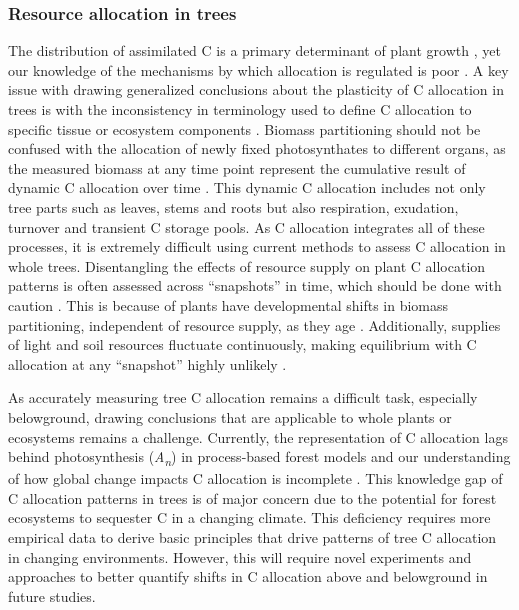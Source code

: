 \documentclass[a4paper]{article}
\begin{document}
\subsubsection*{Resource allocation in trees}
The distribution of assimilated C is a primary determinant of plant growth \citep{friedlingstein1999toward}, yet our knowledge of the mechanisms by which allocation is regulated is poor \citep{poorter2012biomass}. A key issue with drawing generalized conclusions about the plasticity of C allocation in trees is with the inconsistency in terminology used to define C allocation to specific tissue or ecosystem components \citep{litton2007carbon}. Biomass partitioning should not be confused with the allocation of newly fixed photosynthates to different organs, as the measured biomass at any time point represent the cumulative result of dynamic C allocation over time \citep{poorter2015does}. This dynamic C allocation includes not only tree parts such as leaves, stems and roots but also respiration, exudation, turnover and transient C storage pools. As C allocation integrates all of these processes, it is extremely difficult using current methods to assess C allocation in whole trees. Disentangling the effects of resource supply on plant C allocation patterns is often assessed across “snapshots” in time, which should be done with caution \citep{reich2002root}. This is because of plants have developmental shifts in biomass partitioning, independent of resource supply, as they age \citep{muller2000effect, poorter2015does}. Additionally, supplies of light and soil resources fluctuate continuously, making equilibrium with C allocation at any “snapshot” highly unlikely \citep{shipley2002balanced}.

As accurately measuring tree C allocation remains a difficult task, especially belowground, drawing conclusions that are applicable to whole plants or ecosystems remains a challenge. Currently, the representation of C allocation lags behind photosynthesis (\textit{A\textsubscript{n}}) in process-based forest models \citep{friedlingstein1999toward, franklin2012modeling, iversen2014terrestrial} and our understanding of how global change impacts C allocation is incomplete \citep{litton2007carbon, warren2012timing}. This knowledge gap of C allocation patterns in trees is of major concern due to the potential for forest ecosystems to sequester C in a changing climate. This deficiency requires more empirical data to derive basic principles that drive patterns of tree C allocation in changing environments. However, this will require novel experiments and approaches to better quantify shifts in C allocation above and belowground in future studies. 
\end{document}
